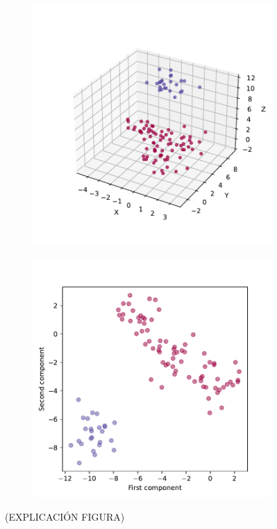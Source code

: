 \begin{figure}[h]
  \centering
  \begin{subfigure}{0.45\textwidth}
    \centering
    \includegraphics[width=\textwidth]{figures/agglomerative-3d.pdf}
    \caption{}
    \label{fig:}
  \end{subfigure}
  \begin{subfigure}{0.45\textwidth}
    \centering
    \includegraphics[width=\textwidth]{figures/aglomerative-pca.pdf}
    \caption{}
    \label{fig:}
  \end{subfigure}
  \caption[Prueba del algoritmo aglomerativo.]{(EXPLICACIÓN FIGURA)}
  \label{fig:}
\end{figure}

